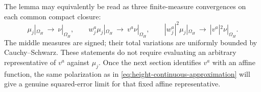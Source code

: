 The lemma may equivalently be read as three finite-measure convergences
on each common compact closure:
\begin{equation}
 \mu_j|_{\Omega_H}\ \longrightarrow\ \nu|_{\Omega_H},\qquad
 w_j^a\mu_j|_{\Omega_H}\ \longrightarrow\ v^a\nu|_{\Omega_H},\qquad
 |w_j^a|^2\mu_j|_{\Omega_H}\ \longrightarrow\ |v^a|^2\nu|_{\Omega_H}.
 \label{eq:height-three-measures}
\end{equation}
The middle measures are signed; their total variations are uniformly
bounded by Cauchy--Schwarz.  These statements do not require evaluating
an arbitrary representative of $v^a$ against $\mu_j$.  Once the next
section identifies $v^a$ with an affine function, the same polarization
as in \eqref{eq:height-continuous-approximation} will give a genuine
squared-error limit for that fixed affine representative.
